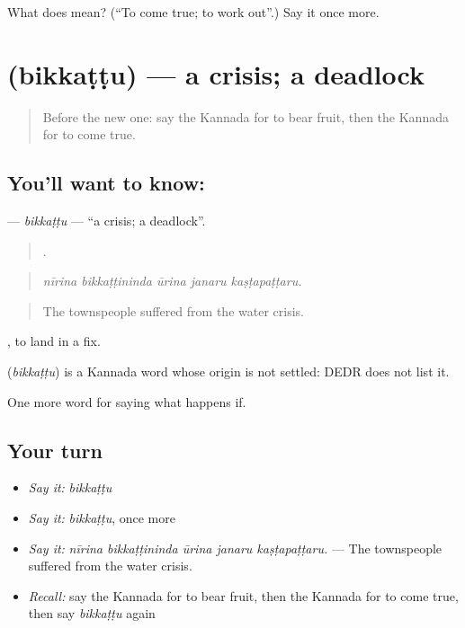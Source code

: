 \begin{tcolorbox}[breakable,colback=teal!4,colframe=teal!35!black,title={Before you move on}]
What does  mean? (\textquotedblleft{}To come true; to work out\textquotedblright{}.) Say it once more.
\end{tcolorbox}
\section[\texorpdfstring{\kn{ಬಿಕ್ಕಟ್ಟು} (bikkaṭṭu)}{ಬಿಕ್ಕಟ್ಟು (bikkaṭṭu)}]{ (bikkaṭṭu) — a crisis; a deadlock}

\label{lesson:KA-C419-bikkattu}



\begin{quote}
Before the new one: say the Kannada for to bear fruit, then the Kannada for to come true.
\end{quote}

\subsection*{You'll want to know: }
\textbf{} — \emph{bikkaṭṭu} — \textquotedblleft{}a crisis; a deadlock\textquotedblright{}.

\begin{quote}
    .
\end{quote}

\begin{quote}
\emph{nīrina bikkaṭṭininda ūrina janaru kaṣṭapaṭṭaru.}
\end{quote}

\begin{quote}
The townspeople suffered from the water crisis.
\end{quote}

 , to land in a fix.

\begin{cousinweb}
\textbf{} (\emph{bikkaṭṭu}) is a Kannada word whose origin is not settled: DEDR does not list it.
\end{cousinweb}

\begin{grammarlens}[title={What you've built}]
One more word for saying what happens if.
\end{grammarlens}

\subsection*{Your turn}
\begin{itemize}
\raggedright
  \item \emph{Say it:} \emph{bikkaṭṭu}
  \item \emph{Say it:} \emph{bikkaṭṭu}, once more
  \item \emph{Say it:} \emph{nīrina bikkaṭṭininda ūrina janaru kaṣṭapaṭṭaru.} — The townspeople suffered from the water crisis.
  \item \emph{Recall:} say the Kannada for to bear fruit, then the Kannada for to come true, then say \emph{bikkaṭṭu} again
\end{itemize}

